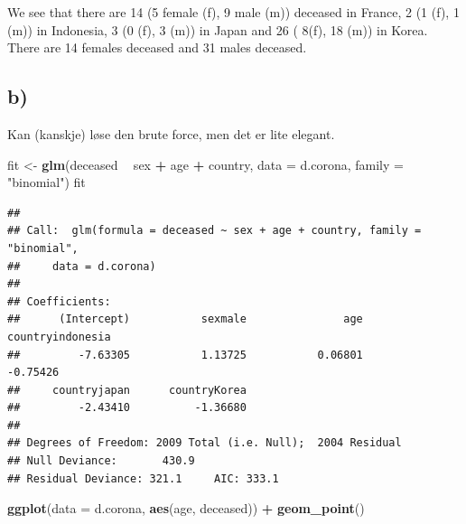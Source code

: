 \documentclass[
]{article}
\newenvironment{Shaded}{\begin{snugshade}}{\end{snugshade}}
\newcommand{\DataTypeTok}[1]{\textcolor[rgb]{0.13,0.29,0.53}{#1}}
\newcommand{\KeywordTok}[1]{\textcolor[rgb]{0.13,0.29,0.53}{\textbf{#1}}}
\newcommand{\NormalTok}[1]{#1}
\newcommand{\OperatorTok}[1]{\textcolor[rgb]{0.81,0.36,0.00}{\textbf{#1}}}
\newcommand{\StringTok}[1]{\textcolor[rgb]{0.31,0.60,0.02}{#1}}
\begin{document}
We see that there are 14 (5 female (f), 9 male (m)) deceased in France,
2 (1 (f), 1 (m)) in Indonesia, 3 (0 (f), 3 (m)) in Japan and 26 ( 8(f),
18 (m)) in Korea. There are 14 females deceased and 31 males deceased.

\hypertarget{b-1}{%
\subsection{b)}\label{b-1}}

Kan (kanskje) løse den brute force, men det er lite elegant.

\begin{Shaded}
\begin{Highlighting}[]
\NormalTok{fit <-}\StringTok{ }\KeywordTok{glm}\NormalTok{(deceased }\OperatorTok{~}\StringTok{ }\NormalTok{sex }\OperatorTok{+}\StringTok{ }\NormalTok{age }\OperatorTok{+}\StringTok{ }\NormalTok{country, }\DataTypeTok{data =}\NormalTok{ d.corona, }\DataTypeTok{family =} \StringTok{"binomial"}\NormalTok{)}
\NormalTok{fit}
\end{Highlighting}
\end{Shaded}

\begin{verbatim}
## 
## Call:  glm(formula = deceased ~ sex + age + country, family = "binomial", 
##     data = d.corona)
## 
## Coefficients:
##      (Intercept)           sexmale               age  countryindonesia  
##         -7.63305           1.13725           0.06801          -0.75426  
##     countryjapan      countryKorea  
##         -2.43410          -1.36680  
## 
## Degrees of Freedom: 2009 Total (i.e. Null);  2004 Residual
## Null Deviance:       430.9 
## Residual Deviance: 321.1     AIC: 333.1
\end{verbatim}

\begin{Shaded}
\begin{Highlighting}[]
\KeywordTok{ggplot}\NormalTok{(}\DataTypeTok{data =}\NormalTok{ d.corona, }\KeywordTok{aes}\NormalTok{(age, deceased)) }\OperatorTok{+}\StringTok{ }\KeywordTok{geom_point}\NormalTok{()}
\end{Highlighting}
\end{Shaded}
\end{document}
